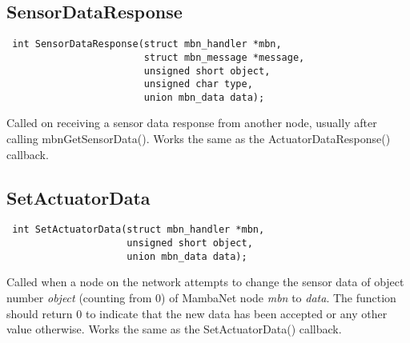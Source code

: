 \documentclass[a4paper]{report}
\begin{document}
\subsection{SensorDataResponse}
\begin{verbatim}
 int SensorDataResponse(struct mbn_handler *mbn,
                        struct mbn_message *message,
                        unsigned short object,
                        unsigned char type,
                        union mbn_data data);
\end{verbatim}
Called on receiving a sensor data response from another node, usually after calling mbnGetSensorData(). Works the same as the ActuatorDataResponse() callback.


\subsection{SetActuatorData}
\begin{verbatim}
 int SetActuatorData(struct mbn_handler *mbn,
                     unsigned short object,
                     union mbn_data data);
\end{verbatim}
Called when a node on the network attempts to change the sensor data of object number \textit{object} (counting from 0) of MambaNet node \textit{mbn} to \textit{data}. The function should return 0 to indicate that the new data has been accepted or any other value otherwise. Works the same as the SetActuatorData() callback.
\end{document}
